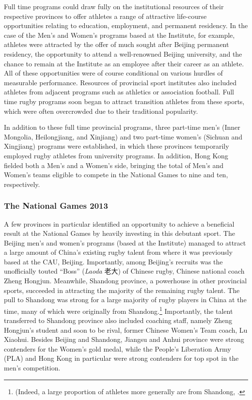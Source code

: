 \begin{CJK}{UTF8}{gbsn}
 Full time programs could draw fully on the institutional resources of their respective provinces to offer athletes a range of attractive life-course opportunities relating to education, employment, and permanent residency.  In the case of the Men's and Women's programs based at the Institute, for example, athletes were attracted by the offer of much sought after Beijing permanent residency, the opportunity to attend a well-renowned Beijing university, and the chance to remain at the Institute as an employee after their career as an athlete.  All of these opportunities were of course conditional on various hurdles of measurable performance.  Resources of provincial sport institutes also included athletes from adjacent programs such as athletics or association football.  Full time rugby programs soon began to attract transition athletes from these sports, which were often overcrowded due to their traditional popularity.

In addition to these full time provincial programs, three part-time men's (Inner Mongolia, Heilongjiang, and Xinjiang) and two part-time women's (Sichuan and Xingjiang) programs were established, in which these provinces temporarily employed rugby athletes from university programs. In addition, Hong Kong fielded both a Men's and a Women's side, bringing the total of Men's and Women's teams eligible to compete in the National Games to nine and ten, respectively.


\subsubsection{The National Games 2013 \label{sect:fallFromGrace}}
A few provinces in particular identified an opportunity to achieve a beneficial result at the National Games by heavily investing in this debutant sport.  The Beijing men's and women's programs (based at the Institute) managed to attract a large amount of China's existing rugby talent from where it was previously based at the CAU, Beijing.  Importantly, among Beijing's recruits was the unofficially touted ``Boss''  (\textit{Laoda} 老大) of Chinese rugby, Chinese national coach Zheng Hongjun.  Meanwhile, Shandong province, a powerhouse in other provincial sports, succeeded in attracting the majority of the remaining rugby talent.  The pull to Shandong was strong for a large majority of rugby players in China at the time, many of which were originally from Shandong.\footnote{(Indeed, a large proportion of athletes more generally are from Shandong, \citep[see][]{Taylor2010}.}  Importantly, the talent transferred to Shandong province also included coaching staff, namely Zheng Hongjun's student and soon to be rival, former Chinese Women's Team coach, Lu Xiaohui.  Besides Beijing and Shandong, Jiangsu and Anhui province were strong contenders for the Women's gold medal, while the People's Liberation Army (PLA) and Hong Kong in particular were strong contenders for top spot in the men's competition.


\end{CJK}
